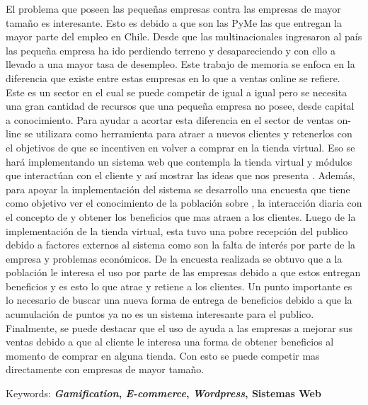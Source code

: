 El problema que poseen las pequeñas empresas contra las empresas de mayor tamaño es interesante. Esto es debido
a que son las PyMe las que entregan la mayor parte del empleo en Chile. Desde que las multinacionales ingresaron
al país las pequeña empresa ha ido perdiendo terreno y desapareciendo y con ello a llevado a una mayor tasa de 
desempleo.
Este trabajo de memoria se enfoca en la diferencia que existe entre estas empresas en lo que a ventas online
se refiere. Este es un sector en el cual se puede competir de igual a igual pero se necesita una gran cantidad de 
recursos que una pequeña empresa no posee, desde capital a conocimiento. 
Para ayudar a acortar esta diferencia en el sector de ventas on-line se utilizara {\gam} como herramienta para
atraer a nuevos clientes y retenerlos con el objetivos de que se incentiven en volver a comprar en la tienda virtual. 
Eso se hará implementando un sistema web que contempla la tienda virtual y módulos que interactúan con el cliente 
y así mostrar las ideas que nos presenta {\gam}. Además, para apoyar la implementación del sistema se desarrollo
una encuesta que tiene como objetivo ver el conocimiento de la población sobre {\gam}, la interacción diaria con el 
concepto de {\gam} y obtener los beneficios que mas atraen a los clientes.
Luego de la implementación de la tienda virtual, esta tuvo una pobre recepción del publico debido a factores
externos al sistema como son la falta de interés por parte de la empresa y problemas económicos. De la encuesta
realizada se obtuvo que a la población le interesa el uso {\gam} por parte de las empresas debido a que estos
entregan beneficios y es esto lo que atrae y retiene a los clientes. Un punto importante es lo necesario
de buscar una nueva forma de entrega de beneficios debido a que la acumulación de puntos ya no es un sistema 
interesante para el publico.
Finalmente, se puede destacar que el uso de {\gam} ayuda a las empresas a mejorar sus ventas debido a que al 
cliente le interesa una forma de obtener beneficios al momento de comprar en alguna tienda. Con esto se puede
competir mas directamente con empresas de mayor tamaño.

Keywords: \textbf{\emph{Gamification}, \emph{E-commerce}, \emph{Wordpress}, Sistemas Web}
